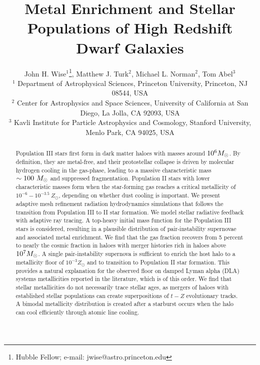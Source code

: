 \documentclass[useAMS,usenatbib]{mn2e}
\begin{document}
\title[High Redshift Dwarf Galaxies]{Metal Enrichment and Stellar
  Populations of High Redshift Dwarf Galaxies}

\author[Wise et al.]{John H. Wise$^1$\thanks{Hubble Fellow; e-mail:
    jwise@astro.princeton.edu}, Matthew J. Turk$^2$, Michael
  L. Norman$^2$, Tom Abel$^3$\\
  $^{1}$ Department of Astrophysical Sciences, Princeton University,
  Princeton, NJ 08544, USA\\
  $^{2}$ Center for Astrophysics and Space Sciences,
    University of California at San Diego, La Jolla, CA 92093, USA\\
  $^{3}$ Kavli Institute for Particle Astrophysics and Cosmology,
  Stanford University, Menlo Park, CA 94025, USA}

\pagerange{\pageref{firstpage}--\pageref{lastpage}} 

\maketitle
\label{firstpage}

\begin{abstract}

  Population III stars first form in dark matter haloes with masses
  around $10^6 \Ms$.  By definition, they are metal-free, and their
  protostellar collapse is driven by molecular hydrogen cooling in the
  gas-phase, leading to a massive characteristic mass $\sim 100~\Ms$
  and suppressed fragmentation.  Population II stars with lower
  characteristic masses form when the star-forming gas reaches a
  critical metallicity of $10^{-6} - 10^{-3.5}~Z_\odot$, depending on
  whether dust cooling is important.  We present adaptive mesh
  refinement radiation hydrodynamics simulations that follows the
  transition from Population III to II star formation.  We model
  stellar radiative feedback with adaptive ray tracing.  A top-heavy
  initial mass function for the Population III stars is considered,
  resulting in a plausible distribution of pair-instability supernovae
  and associated metal enrichment.  We find that the gas fraction
  recovers from 5 percent to nearly the cosmic fraction in haloes with
  merger histories rich in haloes above $10^7 \Ms$.  A single
  pair-instability supernova is sufficient to enrich the host halo to
  a metallicity floor of $10^{-3} Z_\odot$ and to transition to
  Population II star formation.  This provides a natural explanation
  for the observed floor on damped Lyman alpha (DLA) systems
  metallicities reported in the literature, which is of this order.
  We find that stellar metallicities do not necessarily trace stellar
  ages, as mergers of haloes with established stellar populations can
  create superpositions of $t-Z$ evolutionary tracks.  A bimodal
  metallicity distribution is created after a starburst occurs when
  the halo can cool efficiently through atomic line cooling.

\end{abstract}
\end{document}
